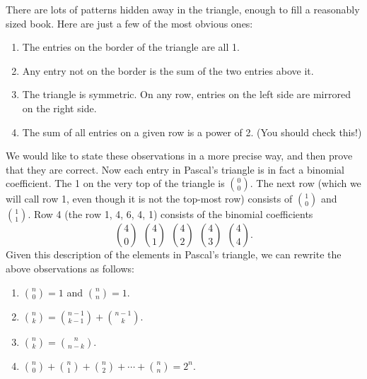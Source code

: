 \documentclass[12pt]{article}
\begin{document}
\begin{center}
\noindent{}

\end{center}

There are lots of patterns hidden away in the triangle, enough to fill a reasonably sized book.  Here are just a few of the most obvious ones:
\begin{enumerate}
  \item The entries on the border of the triangle are all 1.
  \item Any entry not on the border is the sum of the two entries above it.
  \item The triangle is symmetric.  On any row, entries on the left side are mirrored on the right side.
  \item The sum of all entries on a given row is a power of 2. (You should check this!)
\end{enumerate}

We would like to state these observations in a more precise way, and then prove that they are correct.  Now each entry in Pascal's triangle is in fact a binomial coefficient.  The 1 on the very top of the triangle is ${0 \choose 0}$.  The next row (which we will call row 1, even though it is not the top-most row) consists of ${1 \choose 0}$ and ${1 \choose 1}$.  Row 4 (the row 1, 4, 6, 4, 1) consists of the binomial coefficients
\[{4 \choose 0} ~~ {4 \choose 1} ~~ {4 \choose 2} ~~ {4 \choose 3} ~~ {4 \choose 4}.\]
Given this description of the elements in Pascal's triangle, we can rewrite the above observations as follows:
\begin{enumerate}
  \item ${n \choose 0} = 1$ and ${n \choose n} = 1$.
  \item ${n \choose k} = {n-1 \choose k-1} + {n-1 \choose k}$.
  \item ${n \choose k} = {n \choose n-k}$.
  \item ${n\choose 0} + {n \choose 1} + {n \choose 2} + \cdots + {n \choose n} = 2^n$.
\end{enumerate}
\end{document}
